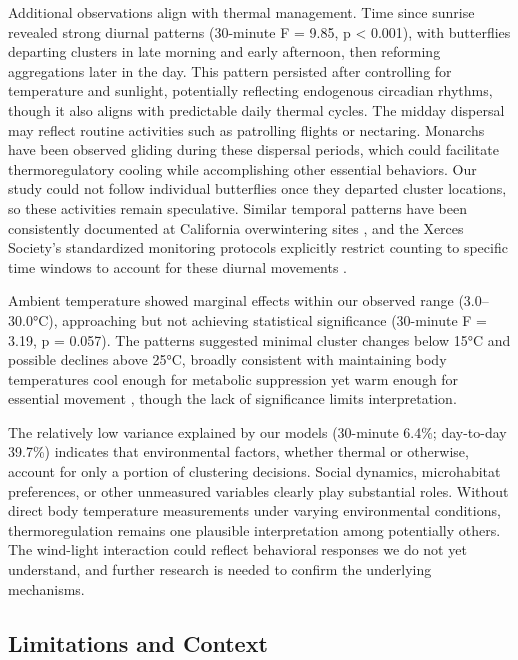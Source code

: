 Additional observations align with thermal management. Time since sunrise revealed strong diurnal patterns (30-minute F = 9.85, p < 0.001), with butterflies departing clusters in late morning and early afternoon, then reforming aggregations later in the day. This pattern persisted after controlling for temperature and sunlight, potentially reflecting endogenous circadian rhythms, though it also aligns with predictable daily thermal cycles. The midday dispersal may reflect routine activities such as patrolling flights or nectaring. Monarchs have been observed gliding during these dispersal periods, which could facilitate thermoregulatory cooling while accomplishing other essential behaviors. Our study could not follow individual butterflies once they departed cluster locations, so these activities remain speculative. Similar temporal patterns have been consistently documented at California overwintering sites \parencite{tuskesOverwinteringEcologyMonarch1978,chaplinEnergyReservesMetabolic1982}, and the Xerces Society's standardized monitoring protocols explicitly restrict counting to specific time windows to account for these diurnal movements \parencite{xercessocietyStepbyStepWesternMonarch2017}.

Ambient temperature showed marginal effects within our observed range (3.0--30.0°C), approaching but not achieving statistical significance (30-minute F = 3.19, p = 0.057). The patterns suggested minimal cluster changes below 15°C and possible declines above 25°C, broadly consistent with maintaining body temperatures cool enough for metabolic suppression yet warm enough for essential movement \parencite{mastersMonarchButterflyDanaus1988}, though the lack of significance limits interpretation.

The relatively low variance explained by our models (30-minute 6.4\%; day-to-day 39.7\%) indicates that environmental factors, whether thermal or otherwise, account for only a portion of clustering decisions. Social dynamics, microhabitat preferences, or other unmeasured variables clearly play substantial roles. Without direct body temperature measurements under varying environmental conditions, thermoregulation remains one plausible interpretation among potentially others. The wind-light interaction could reflect behavioral responses we do not yet understand, and further research is needed to confirm the underlying mechanisms.

\subsection{Limitations and Context}

